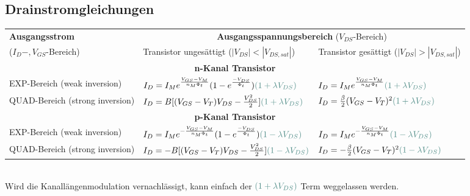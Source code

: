 \subsection{Drainstromgleichungen}
\begin{tabular}{|p{3.8cm}|l|l|}
	\hline
		\textbf{Ausgangsstrom} 
		& \multicolumn{2}{c|}{\textbf{Ausgangsspannungsbereich} ($V_{DS}$-Bereich)}
	\\
		($I_D-, V_{GS}$-Bereich)
		& Transistor ungesättigt ($|V_{DS}| < |V_{DS,sat}|$)
		& Transistor gesättigt ($|V_{DS}| > |V_{DS,sat}|$)
	\\ \hline
		\multicolumn{3}{|c|}{\textbf{n-Kanal Transistor}}
	\\ \hline
		EXP-Bereich \newline (weak inversion)
		& $I_D = I_M e^{\frac{V_{GS}-V_M}{n_M \Phi_t}} (1-e^{\frac{-V_{DS}}{\Phi_t}}) \textcolor{HSRLakeGreen}{(1 + \lambda V_{DS})}$
		& $I_D = I_M e^{\frac{V_{GS}-V_M}{n_M \Phi_t}} \textcolor{HSRLakeGreen}{(1 + \lambda V_{DS})}$
	\\ \hline
		QUAD-Bereich \newline (strong inversion)
		& $I_D = B [(V_{GS} - V_T) V_{DS} - \frac{V_{DS}^2}{2}] \textcolor{HSRLakeGreen}{(1 + \lambda V_{DS})}$
		& $I_D = \frac{\beta}{2}(V_{GS} - V_T)^2 \textcolor{HSRLakeGreen}{(1 + \lambda V_{DS})}$
	\\ \hline
		\multicolumn{3}{|c|}{\textbf{p-Kanal Transistor}}
	\\ \hline
		EXP-Bereich \newline (weak inversion)
		& $I_D = I_M e^{-\frac{V_{GS}-V_M}{n_M \Phi_t}} (1-e^{\frac{-V_{DS}}{\Phi_t}}) \textcolor{HSRLakeGreen}{(1 - \lambda V_{DS})}$
		& $I_D = I_M e^{-\frac{V_{GS}-V_M}{n_M \Phi_t}} \textcolor{HSRLakeGreen}{(1 - \lambda V_{DS})}$
	\\ \hline
		QUAD-Bereich \newline (strong inversion)
		& $I_D = -B [(V_{GS} - V_T) V_{DS} - \frac{V_{DS}^2}{2}] \textcolor{HSRLakeGreen}{(1 - \lambda V_{DS})}$
		& $I_D = -\frac{\beta}{2}(V_{GS} - V_T)^2 \textcolor{HSRLakeGreen}{(1 - \lambda V_{DS})}$
	\\ \hline
\end{tabular} \\

Wird die Kanallängenmodulation vernachlässigt, kann einfach der $\textcolor{HSRLakeGreen}{(1 + \lambda V_{DS})}$ Term weggelassen werden. \\

